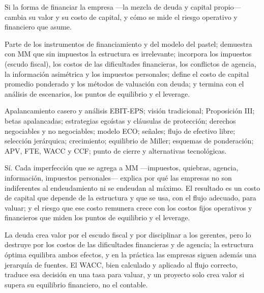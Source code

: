 \begin{control}
Si la forma de financiar la empresa —la mezcla de deuda y capital propio— cambia su valor y su costo de capital, y cómo se mide el riesgo operativo y financiero que asume.

Parte de los instrumentos de financiamiento y del modelo del pastel; demuestra con MM que sin impuestos la estructura es irrelevante; incorpora los impuestos (escudo fiscal), los costos de las dificultades financieras, los conflictos de agencia, la información asimétrica y los impuestos personales; define el costo de capital promedio ponderado y los métodos de valuación con deuda; y termina con el análisis de escenarios, los puntos de equilibrio y el leverage.

Apalancamiento casero y análisis EBIT-EPS; visión tradicional; Proposición III; betas apalancadas; estrategias egoístas y cláusulas de protección; derechos negociables y no negociables; modelo ECO; señales; flujo de efectivo libre; selección jerárquica; crecimiento; equilibrio de Miller; esquemas de ponderación; APV, FTE, WACC y CCF; punto de cierre y alternativas tecnológicas.

Sí. Cada imperfección que se agrega a MM —impuestos, quiebras, agencia, información, impuestos personales— explica por qué las empresas no son indiferentes al endeudamiento ni se endeudan al máximo. El resultado es un costo de capital que depende de la estructura y que se usa, con el flujo adecuado, para valuar; y el riesgo que ese costo remunera crece con los costos fijos operativos y financieros que miden los puntos de equilibrio y el leverage.

La deuda crea valor por el escudo fiscal y por disciplinar a los gerentes, pero lo destruye por los costos de las dificultades financieras y de agencia; la estructura óptima equilibra ambos efectos, y en la práctica las empresas siguen además una jerarquía de fuentes. El WACC, bien calculado y aplicado al flujo correcto, traduce esa decisión en una tasa para valuar, y un proyecto solo crea valor si supera su equilibrio financiero, no el contable.
\end{control}


